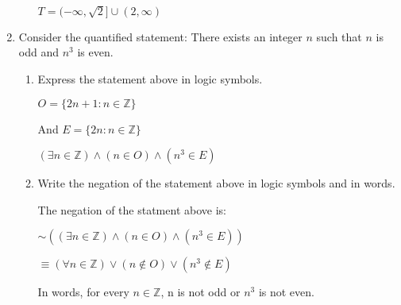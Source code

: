 \documentclass[10pt]{article} %
\newcommand{\Z}{\mathbb{Z}}
\newcommand{\R}{\mathbb{R}}
\begin{document}
\begin{enumerate}
\begin{enumerate}
 \bigskip
 
   $T = (- \infty, \sqrt 2] \cup (2, \infty)$
 
 \bigskip
 
 \end{enumerate}


\item Consider the quantified statement: There exists an integer $n$ such that $n$ is odd and $n^3$ is even.
    \begin{enumerate}
      \item Express the   statement above in logic symbols.
      
      \bigskip
      
       \begin{center} $O= \{2n+1 : n \in \Z\}$ \end{center}
      \begin{center} And $E= \{2n : n \in \Z\}$ \end{center}
      
      \begin{center} $(\exists n \in \Z) \wedge (n \in O) \wedge (n^3 \in E)$ \end{center}
            
      \bigskip
      
      \item Write the negation of the statement above in logic symbols and in words.
      
      \bigskip
      
        The negation of the statment above is:
      
      \begin{center} $\sim ((\exists n \in \Z) \wedge (n \in O) \wedge (n^3 \in E))$\end{center}
      
      \begin{center} $ \equiv (\forall n \in \Z) \vee (n \notin O) \vee (n^3 \notin E)$ \end{center}
      \begin{center}  In words, for every $n \in \Z$, n is not odd or $n^3$ is not even.  \end{center}
      
      \bigskip
      
    \end{enumerate}






\end{enumerate}
\end{document}
